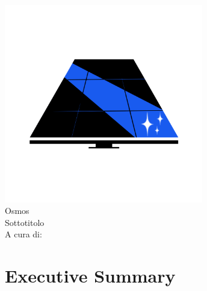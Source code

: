 \documentclass[a4paper, 12pt]{article}
\begin{document}
	
	\linespread{1}
	
	
	\vspace{4cm}
	\begin{center}
		\includegraphics[width=0.65\textwidth]{Images/LogoGIP.png}\\
		{\Huge Osmos}\\
		\vspace{0.5cm}
		{\large Sottotitolo}\\
		\vspace{1cm}
		A cura di:
	\end{center}
	\newpage
	
	\tableofcontents
	\newpage
	
	\section{Executive Summary}
	\newpage
\end{document}
